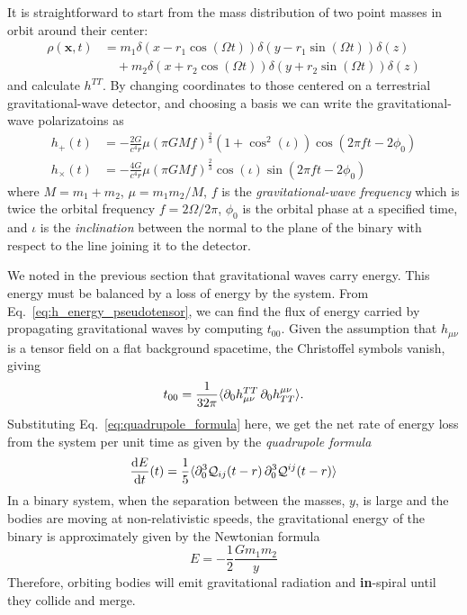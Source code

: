 It is straightforward to start from the mass distribution of two point
masses in orbit around their center:
%
\begin{align*}
\rho(\mathbf{x},t) &= m_1\delta(x - r_1\cos(\Omega t)) \delta(y-r_1
\sin(\Omega t)) \delta(z) \\
&\quad + m_2\delta(x + r_2\cos(\Omega t)) \delta(y + r_2 \sin(\Omega t))
\delta(z)
\end{align*}
%
and calculate $h^{TT}$. By changing coordinates to those centered on a
terrestrial gravitational-wave detector, and choosing a basis we can write the 
gravitational-wave polarizatoins as~\cite{Brown:2004vh}
%
\begin{align}
\label{eq:h_plus_cross}
h_+(t)   &= - \frac{2G}{c^4 r} \mu (\pi G M f)^{\frac{2}{3}}
(1+\cos^2(\iota)) \cos(2\pi f t - 2\phi_0) \\ \nonumber
h_\times(t)  &= - \frac{4G}{c^4 r} \mu (\pi G M f)^{\frac{2}{3}}
\cos(\iota) \sin(2\pi f t - 2\phi_0) \nonumber
\end{align}
%
where $M = m_1+m_2$, $\mu = m_1 m_2 / M$, $f$ is the 
\emph{gravitational-wave frequency} which is twice the orbital frequency 
$f = 2\Omega/2\pi$, $\phi_0$ is the orbital phase at a specified time, and 
$\iota$ is the \emph{inclination} between the normal to the plane of the binary
with respect to the line joining it to the detector.

We noted in the previous section that gravitational waves carry energy. This
energy must be balanced by a loss of energy by the system. From 
Eq.~\ref{eq:h_energy_pseudotensor}, we can find the flux of energy carried by 
propagating gravitational waves by computing $t_{00}$. Given the assumption 
that $h_{\mu\nu}$ is a tensor field on a flat background spacetime, the 
Christoffel symbols vanish, giving
%
\begin{equation}
 t_{00} = \frac{1}{32\pi} \langle\partial_0 h_{\mu\nu}^{TT}\,\partial_0 h^{\mu\nu}_{TT} \rangle.
\end{equation}
%
Substituting Eq.~\ref{eq:quadrupole_formula} here, we get the net rate of 
energy loss from the system per unit time as given by the {\it quadrupole 
formula}
%
\begin{equation}
\label{eq:energy_loss}
\frac{\D E}{\D t}(t) = \frac{1}{5}\langle \pd_0^3\Quad_{ij}(t-r)\,\pd_0^3\Quad^{ij}(t-r)\rangle
\end{equation}
%
In a binary system, when the separation between the masses, $y$, is large 
and the bodies are moving at non-relativistic speeds, the gravitational 
energy of the binary is approximately given by the Newtonian formula
%
\begin{equation*}
E = - \frac{1}{2} \frac{G m_1 m_2}{y}
\end{equation*}
%
Therefore, orbiting bodies will emit gravitational radiation and 
{\bf in}-spiral until they collide and merge.

